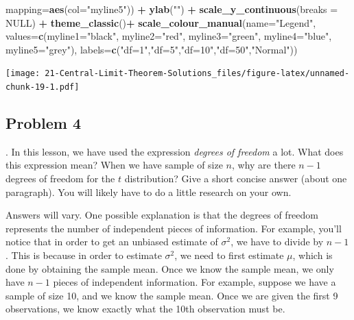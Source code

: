 \documentclass[
]{book}
\newenvironment{Shaded}{\begin{snugshade}}{\end{snugshade}}
\newcommand{\DataTypeTok}[1]{\textcolor[rgb]{0.13,0.29,0.53}{#1}}
\newcommand{\KeywordTok}[1]{\textcolor[rgb]{0.13,0.29,0.53}{\textbf{#1}}}
\newcommand{\NormalTok}[1]{#1}
\newcommand{\OperatorTok}[1]{\textcolor[rgb]{0.81,0.36,0.00}{\textbf{#1}}}
\newcommand{\OtherTok}[1]{\textcolor[rgb]{0.56,0.35,0.01}{#1}}
\newcommand{\StringTok}[1]{\textcolor[rgb]{0.31,0.60,0.02}{#1}}
\begin{document}
\begin{Shaded}
\begin{Highlighting}[]
                \DataTypeTok{mapping=}\KeywordTok{aes}\NormalTok{(}\DataTypeTok{col=}\StringTok{"myline5"}\NormalTok{)) }\OperatorTok{+}\StringTok{ }
\StringTok{   }\KeywordTok{ylab}\NormalTok{(}\StringTok{""}\NormalTok{) }\OperatorTok{+}
\StringTok{  }\KeywordTok{scale_y_continuous}\NormalTok{(}\DataTypeTok{breaks =} \OtherTok{NULL}\NormalTok{) }\OperatorTok{+}
\StringTok{   }\KeywordTok{theme_classic}\NormalTok{()}\OperatorTok{+}
\KeywordTok{scale_colour_manual}\NormalTok{(}\DataTypeTok{name=}\StringTok{"Legend"}\NormalTok{,}
    \DataTypeTok{values=}\KeywordTok{c}\NormalTok{(}\DataTypeTok{myline1=}\StringTok{"black"}\NormalTok{, }
             \DataTypeTok{myline2=}\StringTok{"red"}\NormalTok{,}
             \DataTypeTok{myline3=}\StringTok{"green"}\NormalTok{,}
             \DataTypeTok{myline4=}\StringTok{"blue"}\NormalTok{,}
             \DataTypeTok{myline5=}\StringTok{"grey"}\NormalTok{),}
    \DataTypeTok{labels=}\KeywordTok{c}\NormalTok{(}\StringTok{"df=1"}\NormalTok{,}\StringTok{"df=5"}\NormalTok{,}\StringTok{"df=10"}\NormalTok{,}\StringTok{"df=50"}\NormalTok{,}\StringTok{"Normal"}\NormalTok{))}
\end{Highlighting}
\end{Shaded}

\texttt{[image: 21-Central-Limit-Theorem-Solutions\_files/figure-latex/unnamed-chunk-19-1.pdf]}

\hypertarget{problem-4-9}{%
\subsection{Problem 4}\label{problem-4-9}}

. In this lesson, we have used the expression \emph{degrees of freedom} a lot. What does this expression mean? When we have sample of size \(n\), why are there \(n-1\) degrees of freedom for the \(t\) distribution? Give a short concise answer (about one paragraph). You will likely have to do a little research on your own.

Answers will vary. One possible explanation is that the degrees of freedom represents the number of independent pieces of information. For example, you'll notice that in order to get an unbiased estimate of \(\sigma^2\), we have to divide by \(n-1\). This is because in order to estimate \(\sigma^2\), we need to first estimate \(\mu\), which is done by obtaining the sample mean. Once we know the sample mean, we only have \(n-1\) pieces of independent information. For example, suppose we have a sample of size 10, and we know the sample mean. Once we are given the first 9 observations, we know exactly what the 10th observation must be.
\end{document}
